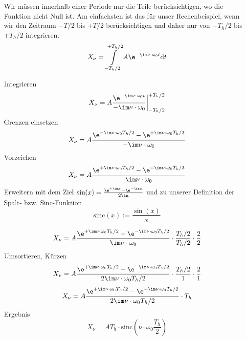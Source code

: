 \begin{Ansatz}
%
Wir müssen innerhalb einer Periode nur die Teile berücksichtigen, wo
die Funktion nicht Null ist. Am einfachsten ist das für unser Rechenbeispiel,
wenn wir den Zeitraum $-T/2$ bis $+T/2$ berücksichtigen und
daher nur von $-T_h/2$ bis $+T_h/2$ integrieren.
\begin{equation}
X_\nu =  \int\limits_{-T_h/2}^{+T_h/2} A \e^{-\im \nu \cdot \omega_0 t} \mathrm{d}t
\end{equation}
%
\end{Ansatz}
%
\begin{ExCalc}
Integrieren
\begin{equation}
X_\nu = A \frac{\e^{-\im \nu \cdot \omega_0 t}}{-\im \nu \cdot \omega_0 }\bigg|_{-T_h/2}^{+T_h/2}
\end{equation}
Grenzen einsetzen
\begin{equation}
X_\nu = A \frac{\e^{-\im \nu \cdot \omega_0 T_h/2} - \e^{+\im \nu \cdot \omega_0 T_h/2}}{-\im \nu \cdot \omega_0 }
\end{equation}
Vorzeichen
\begin{equation}
X_\nu = A \frac{\e^{+\im \nu \cdot \omega_0 T_h/2}-\e^{-\im \nu \cdot \omega_0 T_h/2}}{\im \nu \cdot \omega_0 }
\end{equation}
Erweitern mit dem Ziel $\sin(x) = \frac{\e^{+\im x}-\e^{-\im x}}{2\im}$ und zu unserer Definition der Spalt- bzw. Sinc-Funktion
$$\mathrm{sinc}(x):=\frac{\sin(x)}{x}$$

\begin{equation}
X_\nu = A \frac{\e^{+\im \nu \cdot \omega_0 T_h/2}-\e^{-\im \nu \cdot \omega_0 T_h/2}}{\im \nu \cdot \omega_0 } \cdot \frac{T_h/2}{T_h/2} \cdot \frac{2}{2}
\end{equation}
Umsortieren, Kürzen
\begin{equation}
X_\nu = A \frac{\e^{+\im \nu \cdot \omega_0 T_h/2}-\e^{-\im \nu \cdot \omega_0 T_h/2}}{2\im \nu \cdot \omega_0 T_h/2} \cdot \frac{T_h/2}{1} \cdot \frac{2}{1}
\end{equation}
%
\begin{equation}
X_\nu = A \frac{\e^{+\im \nu \cdot \omega_0 T_h/2}-\e^{-\im \nu \cdot \omega_0 T_h/2}}{2\im \nu \cdot \omega_0 T_h/2} \cdot T_h
\end{equation}
%
Ergebnis
\begin{equation}
X_\nu = A T_h \cdot \mathrm{sinc}(\nu \cdot \omega_0 \frac{T_h}{2})
\end{equation}
\end{ExCalc}

